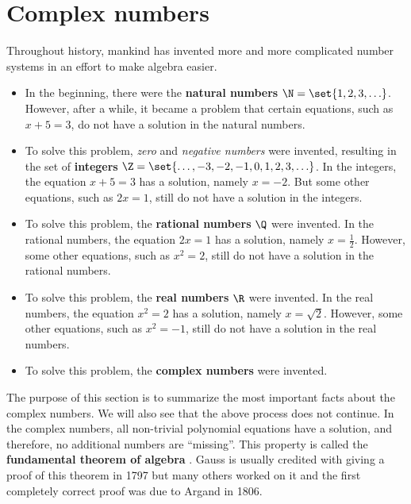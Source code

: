 \chapter{Complex numbers}
\label{app:complex}

Throughout history, mankind has invented more and more complicated
number systems in an effort to make algebra easier.
\begin{itemize}
\item In the beginning, there were the \textbf{natural numbers}%
   $\N = \set{1, 2, 3, \ldots}$. However,
  after a while, it became a problem that certain equations, such as
  $x+5=3$, do not have a solution in the natural numbers.
\item To solve this problem, {\em zero} and {\em negative numbers}
  were invented, resulting in the set of \textbf{integers}%
   $\Z=\set{\ldots,-3,-2,-1,0,1,2,3,\ldots}$. In
  the integers, the equation $x+5=3$ has a solution, namely
  $x=-2$. But some other equations, such as $2x=1$, still do not have
  a solution in the integers.
\item To solve this problem, the \textbf{rational numbers}%
   $\Q$ were invented. In the rational
  numbers, the equation $2x=1$ has a solution, namely
  $x=\frac{1}{2}$. However, some other equations, such as $x^2=2$,
  still do not have a solution in the rational numbers.
\item To solve this problem, the \textbf{real numbers}%
   $\R$ were invented. In the real numbers,
  the equation $x^2=2$ has a solution, namely $x=\sqrt{2}$. However,
  some other equations, such as $x^2=-1$, still do not have a solution
  in the real numbers.
\item To solve this problem, the \textbf{complex numbers}%
   were invented.
\end{itemize}
The purpose of this section is to summarize the most important facts
about the complex numbers. We will also see that the above process
does not continue. In the complex numbers, all non-trivial polynomial
equations have a solution, and therefore, no additional numbers are
``missing''.  This property is called the \textbf{fundamental theorem
  of algebra}%
%
. Gauss is usually credited with
giving a proof of this theorem in 1797 but many others worked on it
and the first completely correct proof was due to Argand in 1806.

